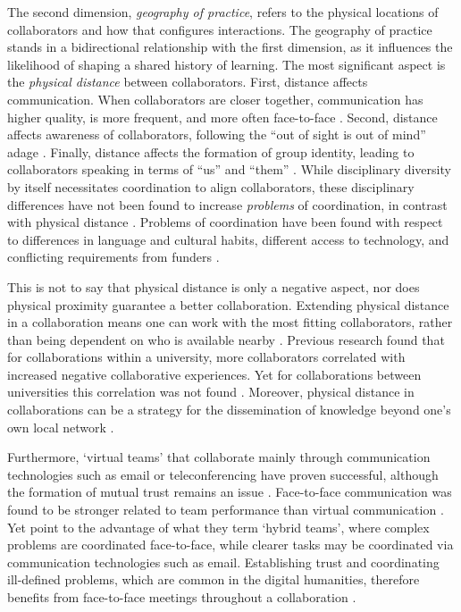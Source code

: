 \documentclass{article}
\begin{document}
The second dimension, \textit{geography of practice}, refers to the physical locations of collaborators and how that configures interactions. 
The geography of practice stands in a bidirectional relationship with the first dimension, as it influences the likelihood of shaping a shared history of learning.
The most significant aspect is the \textit{physical distance} between collaborators. 
First, distance affects communication. When collaborators are closer together, communication has higher quality, is more frequent, and more often face-to-face \citep{Kiesler2002,Kraut1988}. 
Second, distance affects awareness of collaborators, following the ``out of sight is out of mind'' adage \citep{Olson2002}.
Finally, distance affects the formation of group identity, leading to collaborators speaking in terms of ``us'' and ``them'' \citep{Armstrong2002}.
While disciplinary diversity by itself necessitates coordination to align collaborators, these disciplinary differences have not been found to increase \textit{problems} of coordination, in contrast with physical distance \citep{Cummings2005,Walsh2007}.
Problems of coordination have been found with respect to differences in language and cultural habits, different access to technology, and conflicting requirements from funders \citep{siemens2013}.

This is not to say that physical distance is only a negative aspect, nor does physical proximity guarantee a better collaboration.
Extending physical distance in a collaboration means one can work with the most fitting collaborators, rather than being dependent on who is available nearby \citep{siemens2013}. 
Previous research found that for collaborations within a university, more collaborators correlated with increased negative collaborative experiences. Yet for collaborations between universities this correlation was not found \citep{tsai2016}.
Moreover, physical distance in collaborations can be a strategy for the dissemination of knowledge beyond one's own local network \citep{poole2013}.

Furthermore, `virtual teams' that collaborate mainly through communication technologies such as email or teleconferencing have proven successful, although the formation of mutual trust remains an issue \citep{purvanova2014}.
Face-to-face communication was found to be stronger related to team performance than virtual communication \citep{marlow2018}.
Yet \citeauthor{marlow2018} point to the advantage of what they term `hybrid teams', where complex problems are coordinated face-to-face, while clearer tasks may be coordinated via communication technologies such as email.
Establishing trust and coordinating ill-defined problems, which are common in the digital humanities, therefore benefits from face-to-face meetings throughout a collaboration \citep{siemens2013}.
\end{document}

